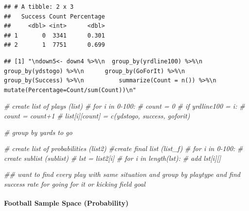 \documentclass[]{article}
\newenvironment{Shaded}{\begin{snugshade}}{\end{snugshade}}
\newcommand{\CommentTok}[1]{\textcolor[rgb]{0.56,0.35,0.01}{\textit{#1}}}
\newcommand{\StringTok}[1]{\textcolor[rgb]{0.31,0.60,0.02}{#1}}
\let\oldparagraph\paragraph
\renewcommand{\paragraph}[1]{\oldparagraph{#1}\mbox{}}
\begin{document}
\begin{verbatim}
## # A tibble: 2 x 3
##   Success Count Percentage
##     <dbl> <int>      <dbl>
## 1       0  3341      0.301
## 2       1  7751      0.699
\end{verbatim}

\begin{Shaded}
\end{Shaded}

\begin{verbatim}
## [1] "\ndown5<- down4 %>%\n  group_by(yrdline100) %>%\n    group_by(ydstogo) %>%\n      group_by(GoForIt) %>%\n        group_by(Success) %>%\n          summarize(Count = n()) %>%\n          mutate(Percentage=Count/sum(Count))\n"
\end{verbatim}

\begin{Shaded}
\begin{Highlighting}[]
\CommentTok{# create list of plays (list)}
\CommentTok{# for i in 0-100:}
\CommentTok{#   count = 0}
\CommentTok{#   if yrdline100 = i:}
\CommentTok{#       count = count+1}
\CommentTok{#       list[i][count] = c(ydstogo, success, goforit)}

\CommentTok{# group by yards to go}

\CommentTok{# create list of probabilities (list2)}
\CommentTok{#create final list (list_f)}
\CommentTok{# for i in 0-100:}
\CommentTok{#   create sublist (sublist)}
\CommentTok{#   lst = list2[i]}
\CommentTok{#   for i in length(lst):}
\CommentTok{#       add lst[i][]}


\CommentTok{## want to find every play with same situation and group by playtype and find success rate for going for it or kicking field goal}
\end{Highlighting}
\end{Shaded}

\hypertarget{football-sample-space-probability}{%
\paragraph{Football Sample Space
(Probability)}\label{football-sample-space-probability}}
\end{document}
